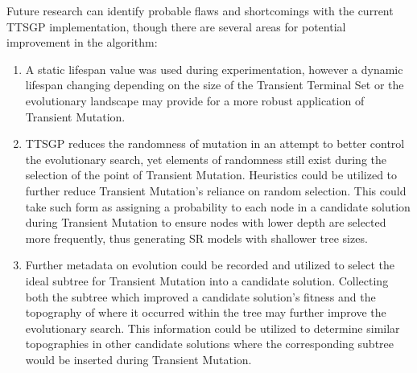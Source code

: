 \documentclass[a4paper, twocolumn]{article}
\begin{document}
Future research can identify probable flaws and shortcomings with the current TTSGP implementation, though there are several areas for potential improvement in the algorithm:
\begin{enumerate}
	\item A static lifespan value was used during experimentation, however a dynamic lifespan changing depending on the size of the Transient Terminal Set or the evolutionary landscape may provide for a more robust application of Transient Mutation. 
	\item TTSGP reduces the randomness of mutation in an attempt to better control the evolutionary search, yet elements of randomness still exist during the selection of the point of Transient Mutation. Heuristics could be utilized to further reduce Transient Mutation's reliance on random selection. This could take such form as assigning a probability to each node in a candidate solution during Transient Mutation to ensure nodes with lower depth are selected more frequently, thus generating SR models with shallower tree sizes. 
	\item Further metadata on evolution could be recorded and utilized to select the ideal subtree for Transient Mutation into a candidate solution. Collecting both the subtree which improved a candidate solution's fitness and the topography of where it occurred within the tree may further improve the evolutionary search. This information could be utilized to determine similar topographies in other candidate solutions where the corresponding subtree would be inserted during Transient Mutation.
\end{enumerate}
\medskip
\printbibliography
\onecolumn
\appendix
\appendixpage
\end{document}
